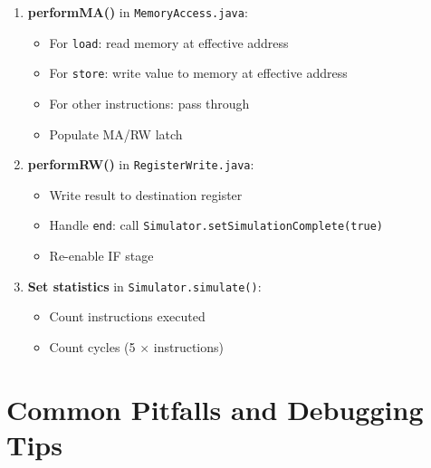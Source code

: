 \documentclass[12pt,a4paper]{article}
\begin{document}
\begin{tcolorbox}[colback=blue!5, colframe=blue!50!black, title=Implementation Checklist]
\begin{enumerate}
    \item \textbf{performMA()} in \texttt{MemoryAccess.java}:
    \begin{itemize}
        \item For \texttt{load}: read memory at effective address
        \item For \texttt{store}: write value to memory at effective address
        \item For other instructions: pass through
        \item Populate MA/RW latch
    \end{itemize}

    \item \textbf{performRW()} in \texttt{RegisterWrite.java}:
    \begin{itemize}
        \item Write result to destination register
        \item Handle \texttt{end}: call \texttt{Simulator.setSimulationComplete(true)}
        \item Re-enable IF stage
    \end{itemize}

    \item \textbf{Set statistics} in \texttt{Simulator.simulate()}:
    \begin{itemize}
        \item Count instructions executed
        \item Count cycles (5 $\times$ instructions)
    \end{itemize}
\end{enumerate}
\end{tcolorbox}

\section{Common Pitfalls and Debugging Tips}
\end{document}
